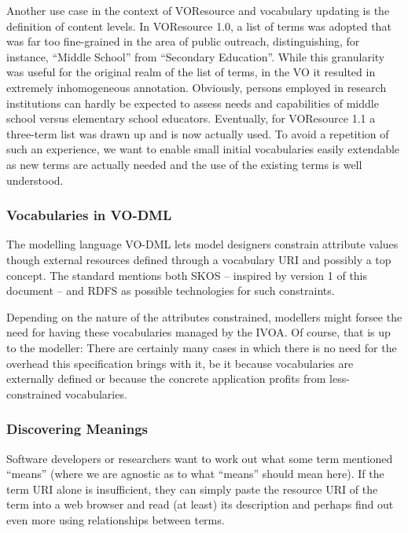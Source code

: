 \documentclass[11pt,a4paper]{ivoa}
\begin{document}
Another use case in the context of VOResource and vocabulary updating
is the definition of content levels.  In VOResource 1.0, a list of
terms was adopted that was far too fine-grained in the area of public
outreach, distinguishing, for instance, ``Middle School'' from
``Secondary Education''. While this granularity was useful for the
original realm of the list of terms, in the VO it resulted in extremely
inhomogeneous annotation.  Obviously, persons employed in research
institutions can hardly be expected to assess needs and capabilities of
middle school versus elementary school educators.  Eventually, for
VOResource 1.1 a three-term list was drawn up and is now actually used.
To avoid a repetition of such an experience, we want to enable small
initial vocabularies easily extendable as new terms are actually needed
and the use of the existing terms is well understood.


\subsubsection{Vocabularies in VO-DML}

The modelling language VO-DML \citep{2018ivoa.spec.0910L} lets model
designers constrain attribute values though external resources defined
through a vocabulary URI and possibly a top concept.  The standard
mentions both SKOS -- inspired by version 1 of this document -- and RDFS
as possible technologies for such constraints.

Depending on the nature of the attributes constrained, modellers might
forsee the need for having these vocabularies managed by the IVOA.  Of
course, that is up to the modeller: There are certainly many cases in
which there is no need for the overhead this specification brings with
it, be it because vocabularies are externally defined or because the
concrete application profits from less-constrained vocabularies.

\subsubsection{Discovering Meanings}
\label{uc:discovering}

Software developers or researchers want to work out
what some term mentioned ``means'' (where we are agnostic as to what
``means'' should mean here).  If the term URI alone is insufficient,
they can simply paste the resource URI of the term into a web browser
and read (at least) its description and perhaps find out even more using
relationships between terms.
\end{document}
